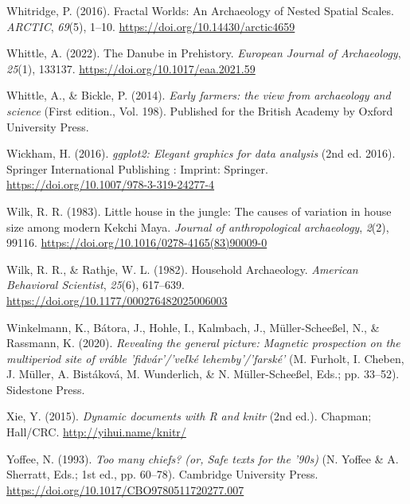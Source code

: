 \documentclass[
  12pt,
]{book}
\newlength{\cslhangindent}
\newlength{\cslentryspacingunit} %
\newenvironment{CSLReferences}[2] %
 {%
  \setlength{\parindent}{0pt}
  \ifodd #1
  \let\oldpar\par
  \def\par{\hangindent=\cslhangindent\oldpar}
  \fi
  \setlength{\parskip}{#2\cslentryspacingunit}
 }%
 {}
\begin{document}
\begin{CSLReferences}{1}{0}
\leavevmode{}%
Whitridge, P. (2016). Fractal Worlds: An Archaeology of Nested Spatial Scales. \emph{ARCTIC}, \emph{69}(5), 1--10. \url{https://doi.org/10.14430/arctic4659}

\leavevmode{}%
Whittle, A. (2022). The Danube in Prehistory. \emph{European Journal of Archaeology}, \emph{25}(1), 133137. \url{https://doi.org/10.1017/eaa.2021.59}

\leavevmode{}%
Whittle, A., \& Bickle, P. (2014). \emph{Early farmers: the view from archaeology and science} (First edition., Vol. 198). Published for the British Academy by Oxford University Press.

\leavevmode{}%
Wickham, H. (2016). \emph{ggplot2: Elegant graphics for data analysis} (2nd ed. 2016). Springer International Publishing : Imprint: Springer. \url{https://doi.org/10.1007/978-3-319-24277-4}

\leavevmode{}%
Wilk, R. R. (1983). Little house in the jungle: The causes of variation in house size among modern Kekchi Maya. \emph{Journal of anthropological archaeology}, \emph{2}(2), 99116. \url{https://doi.org/10.1016/0278-4165(83)90009-0}

\leavevmode{}%
Wilk, R. R., \& Rathje, W. L. (1982). Household Archaeology. \emph{American Behavioral Scientist}, \emph{25}(6), 617--639. \url{https://doi.org/10.1177/000276482025006003}

\leavevmode{}%
Winkelmann, K., Bátora, J., Hohle, I., Kalmbach, J., Müller-Scheeßel, N., \& Rassmann, K. (2020). \emph{Revealing the general picture: Magnetic prospection on the multiperiod site of vráble 'fidvár'/'ve{ľ}ké lehemby'/'farské'} (M. Furholt, I. Cheben, J. Müller, A. Bistáková, M. Wunderlich, \& N. Müller-Scheeßel, Eds.; pp. 33--52). Sidestone Press.

\leavevmode{}%
Xie, Y. (2015). \emph{Dynamic documents with {R} and knitr} (2nd ed.). Chapman; Hall/CRC. \url{http://yihui.name/knitr/}

\leavevmode{}%
Yoffee, N. (1993). \emph{Too many chiefs? (or, Safe texts for the '90s)} (N. Yoffee \& A. Sherratt, Eds.; 1st ed., pp. 60--78). Cambridge University Press. \url{https://doi.org/10.1017/CBO9780511720277.007}


\end{CSLReferences}
\end{document}
